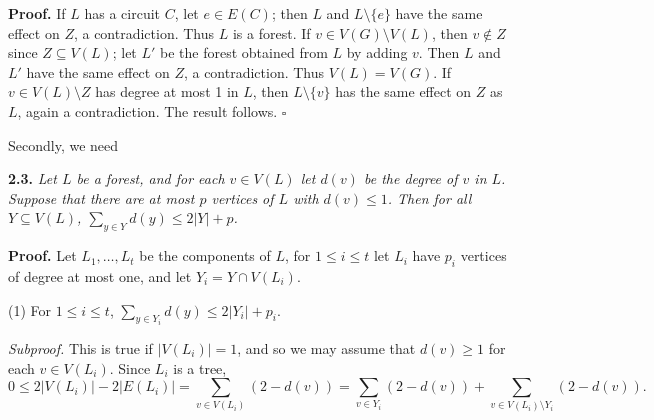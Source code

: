 \textbf{Proof.} If $L$ has a circuit $C$, let $e \in E(C)$; then $L$ and $L \setminus \{e\}$ have the same effect on $Z$, a contradiction. Thus $L$ is a forest. If $v \in V(G) \setminus V(L)$, then $v \notin Z$ since $Z \subseteq V(L)$; let $L'$ be the forest obtained from $L$ by adding $v$. Then $L$ and $L'$ have the same effect on $Z$, a contradiction. Thus $V(L) = V(G)$. If $v \in V(L) \setminus Z$ has degree at most 1 in $L$, then $L \setminus \{v\}$ has the same effect on $Z$ as $L$, again a contradiction. The result follows. $\square$

Secondly, we need

\textbf{2.3.} \textit{Let $L$ be a forest, and for each $v \in V(L)$ let $d(v)$ be the degree of $v$ in $L$. Suppose that there are at most $p$ vertices of $L$ with $d(v) \le 1$. Then for all $Y \subseteq V(L)$, $\sum_{y \in Y} d(y) \le 2|Y| + p$.}

\textbf{Proof.} Let $L_1, \ldots, L_t$ be the components of $L$, for $1 \le i \le t$ let $L_i$ have $p_i$ vertices of degree at most one, and let $Y_i = Y \cap V(L_i)$.

\hspace*{12pt}(1) For $1 \le i \le t$, $\sum_{y \in Y_i} d(y) \le 2|Y_i| + p_i$.

\textit{Subproof.} This is true if $|V(L_i)| = 1$, and so we may assume that $d(v) \ge 1$ for each $v \in V(L_i)$. Since $L_i$ is a tree,
\begin{equation*}
0 \le 2|V(L_i)| - 2|E(L_i)| = \sum_{v \in V(L_i)} (2 - d(v)) = \sum_{v \in Y_i} (2 - d(v)) + \sum_{v \in V(L_i) \setminus Y_i} (2 - d(v)).
\end{equation*}
